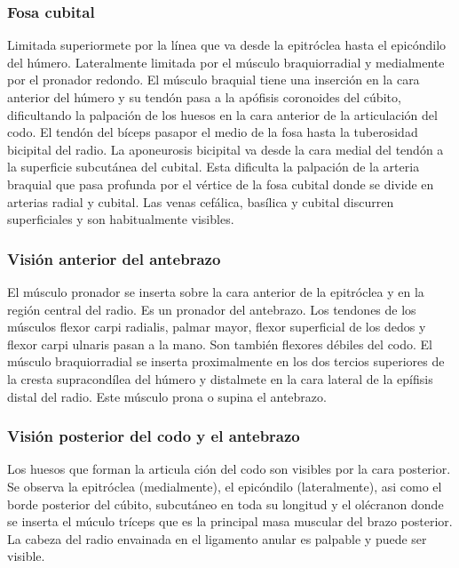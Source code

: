 \documentclass[a4paper,12pt]{article} %
\begin{document}
\begin{appendices}
\subsubsection{Fosa cubital}
Limitada superiormete por la línea que va desde la epitróclea hasta el epicóndilo del húmero. Lateralmente limitada por el músculo braquiorradial y medialmente por el pronador redondo.
El músculo braquial tiene una inserción en la cara anterior del húmero y su tendón pasa a la apófisis coronoides del cúbito, dificultando la palpación de los huesos en la cara anterior de la articulación del codo. El tendón del bíceps pasapor el medio de la fosa hasta la tuberosidad bicipital del radio. La aponeurosis bicipital va desde la cara medial del tendón a la superficie subcutánea del cubital. Esta dificulta la palpación de la arteria braquial que pasa profunda por el vértice de la fosa cubital donde se divide en arterias radial y cubital. Las venas cefálica, basílica y cubital discurren superficiales y son habitualmente visibles.

\subsubsection{Visión anterior del antebrazo}
El músculo pronador se inserta sobre la cara anterior de la epitróclea y en la región central del radio. Es un pronador del antebrazo. Los tendones de los músculos flexor carpi radialis, palmar mayor, flexor superficial de los dedos y flexor carpi ulnaris pasan a la mano. Son también flexores débiles del codo.
El músculo braquiorradial se inserta proximalmente  en los dos tercios superiores de la cresta supracondílea del húmero y distalmete en la cara lateral de la epífisis distal del radio. Este músculo prona o supina el antebrazo.

\subsubsection{Visión posterior del codo y el antebrazo}
Los huesos que forman la articula ción del codo son visibles por la cara posterior. Se observa la epitróclea (medialmente), el epicóndilo (lateralmente), asi como el borde posterior del cúbito, subcutáneo en toda su longitud y el olécranon donde se inserta el múculo tríceps que es la principal masa muscular del brazo posterior. La cabeza del radio envainada en el ligamento anular es palpable y puede ser visible.


\end{appendices}
\end{document}
